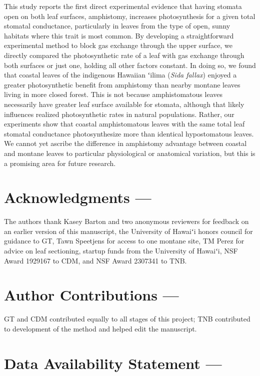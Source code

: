 \documentclass[
  letterpaper,
  DIV=11,
  numbers=noendperiod]{scrartcl}
\begin{document}
This study reports the first direct experimental evidence that having
stomata open on both leaf surfaces, amphistomy, increases photosynthesis
for a given total stomatal conductance, particularly in leaves from the
type of open, sunny habitats where this trait is most common. By
developing a straightforward experimental method to block gas exchange
through the upper surface, we directly compared the photosynthetic rate
of a leaf with gas exchange through both surfaces or just one, holding
all other factors constant. In doing so, we found that coastal leaves of
the indigenous Hawaiian ʻilima (\emph{Sida fallax}) enjoyed a greater
photosynthetic benefit from amphistomy than nearby montane leaves living
in more closed forest. This is not because amphistomatous leaves
necessarily have greater leaf surface available for stomata, although
that likely influences realized photosynthetic rates in natural
populations. Rather, our experiments show that coastal amphistomatous
leaves with the same total leaf stomatal conductance photosynthesize
more than identical hypostomatous leaves. We cannot yet ascribe the
difference in amphistomy advantage between coastal and montane leaves to
particular physiological or anatomical variation, but this is a
promising area for future research.

\hypertarget{acknowledgments}{%
\section{Acknowledgments ---}\label{acknowledgments}}

The authors thank Kasey Barton and two anonymous reviewers for feedback
on an earlier version of this manuscript, the University of Hawaiʻi
honors council for guidance to GT, Tawn Speetjens for access to one
montane site, TM Perez for advice on leaf sectioning, startup funds from
the University of Hawaiʻi, NSF Award 1929167 to CDM, and NSF Award
2307341 to TNB.

\hypertarget{author-ontributions}{%
\section{Author Contributions ---}\label{author-ontributions}}

GT and CDM contributed equally to all stages of this project; TNB
contributed to development of the method and helped edit the manuscript.

\hypertarget{data-availability-statement}{%
\section{Data Availability Statement
---}\label{data-availability-statement}}
\end{document}
